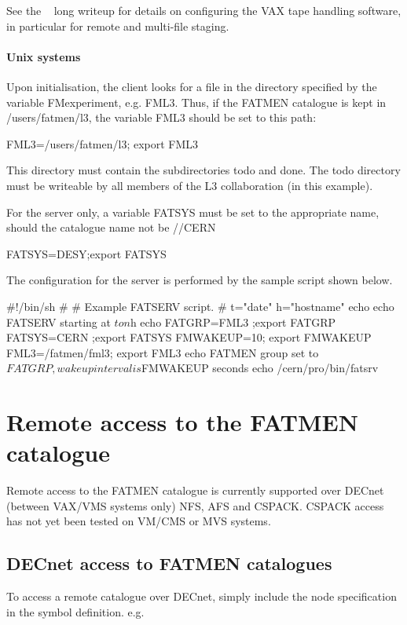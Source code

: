 See the ~\cite{bib-VAXTAP} long writeup for details on configuring
the VAX tape handling software, in particular for remote and
multi-file staging.
\subsubsection{Unix systems}
\par
Upon initialisation, the client looks for a file in the directory
specified by the variable FMexperiment, e.g. FML3. Thus,
if the FATMEN catalogue is kept in /users/fatmen/l3, the variable
FML3 should be set to this path:
\begin{XMP}
FML3=/users/fatmen/l3; export FML3
\end{XMP}
This directory must contain the subdirectories
todo and done. The todo directory
must be writeable by all members of the L3 collaboration (in this example).
\par
For the server only, a variable FATSYS must be
set to the appropriate name, should the catalogue name not be //CERN
\begin{XMP}
FATSYS=DESY;export FATSYS
\end{XMP}
\par
The configuration for the server is performed by the
sample script shown below.
\begin{XMP}
#!/bin/sh
#
# Example FATSERV script.
#
t="date"
h="hostname"
echo
echo FATSERV starting at $t on $h
echo
FATGRP=FML3   ;export FATGRP
FATSYS=CERN   ;export FATSYS
FMWAKEUP=10;   export FMWAKEUP
FML3=/fatmen/fml3; export FML3
echo FATMEN group set to $FATGRP , wakeup interval is $FMWAKEUP seconds
echo
/cern/pro/bin/fatsrv
\end{XMP}
\chapter{Remote access to the FATMEN catalogue}
\par
Remote access to the FATMEN catalogue is currently supported
over DECnet (between VAX/VMS systems only) NFS, AFS and CSPACK.
CSPACK access has not yet been tested on VM/CMS or MVS systems.
\section{DECnet access to FATMEN catalogues}
\par
{}
To access a remote catalogue over DECnet, simply include
the node specification in the symbol definition. e.g.
